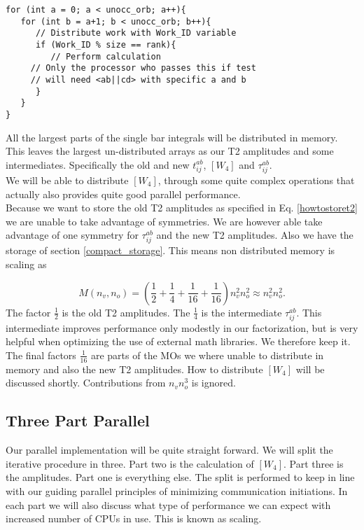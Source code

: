 \documentclass[a4paper,norsk,11pt,twoside]{report}
\begin{document}
\begin{lstlisting}
for (int a = 0; a < unocc_orb; a++){
   for (int b = a+1; b < unocc_orb; b++){
      // Distribute work with Work_ID variable
      if (Work_ID % size == rank){
         // Perform calculation
     // Only the processor who passes this if test
     // will need <ab||cd> with specific a and b
      }
   }
}
\end{lstlisting}

All the largest parts of the single bar integrals will be distributed in memory. This leaves the largest un-distributed arrays as our T2 amplitudes and some intermediates. Specifically the old and new $t_{ij}^{ab}$, $[W_4]$ and $\tau_{ij}^{ab}$. \\

We will be able to distribute $[W_4]$, through some quite complex operations that actually also provides quite good parallel performance. \\

Because we want to store the old T2 amplitudes as specified in Eq. \eqref{howtostoret2} we are unable to take advantage of symmetries. We are however able take advantage of one symmetry for $\tau_{ij}^{ab}$ and the new T2 amplitudes. Also we have the storage of section \ref{compact_storage}. This means non distributed memory is scaling as

\begin{equation}
M(n_v, n_o) = \left(\frac{1}{2} + \frac{1}{4} + \frac{1}{16} + \frac{1}{16} \right) n_v^2 n_o^2 \approx n_v^2 n_o^2 .
\end{equation}
The factor $\frac{1}{2}$ is the old T2 amplitudes. The $\frac{1}{4}$ is the intermediate $\tau_{ij}^{ab}$. This intermediate improves performance only modestly in our factorization, but is very helpful when optimizing the use of external math libraries. We therefore keep it. The final factors $\frac{1}{16}$ are parts of the MOs we where unable to distribute in memory and also the new T2 amplitudes. How to distribute $[W_4]$ will be discussed shortly. Contributions from $n_v n_o^3$ is ignored.

\subsection{Three Part Parallel}
Our parallel implementation will be quite straight forward. We will split the iterative procedure in three. Part two is the calculation of $[W_4]$. Part three is the amplitudes. Part one is everything else. The split is performed to keep in line with our guiding parallel principles of minimizing communication initiations. In each part we will also discuss what type of performance we can expect with increased number of CPUs in use. This is known as scaling. \\
\end{document}
